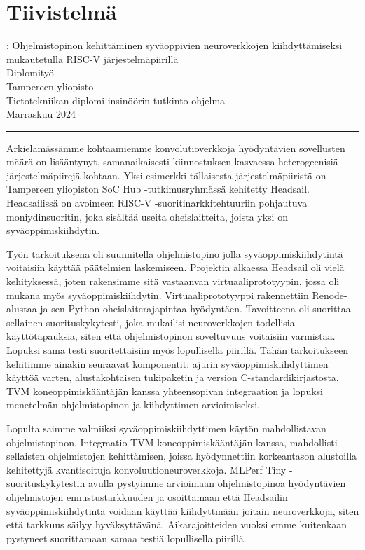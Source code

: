 \documentclass[12pt,a4paper,english
]{tunithesis}
\def\finnishtitle{Ohjelmistopinon kehittäminen syväoppivien neuroverkkojen kiihdyttämiseksi mukautetulla RISC-V järjestelmäpiirillä}
\begin{document}
\clearpage

\chapter*{Tiivistelmä}

\begin{spacing}{1.0}
\noindent \@author: \finnishtitle\\
Diplomityö\\
Tampereen yliopisto\\
Tietotekniikan diplomi-insinöörin tutkinto-ohjelma \\
Marraskuu 2024
\end{spacing}
\noindent\rule{12cm}{0.4pt}

\vspace{0.5cm}


\noindent \foreignlanguage{finnish}{Arkielämässämme kohtaamiemme konvolutioverkkoja hyödyntävien sovellusten mää\-rä on lisääntynyt, samanaikaisesti kiinnostuksen kasvaessa heterogeenisiä jär\-jes\-tel\-mä\-pii\-re\-jä kohtaan. Yksi esimerkki tällaisesta järjestelmäpiiristä on Tampereen yliopiston SoC Hub -tutkimusryhmässä kehitetty Headsail. Headsailissä on avoimeen RISC-V -suoritinarkkitehtuuriin pohjautuva moniydinsuoritin, joka sisältää useita
oheislaitteita, joista yksi on syväoppimiskiihdytin.}

\foreignlanguage{finnish}{Työn tarkoituksena oli suunnitella ohjelmistopino jolla syväoppimiskiihdytintä voitaisiin käyttää päätelmien laskemiseen.
Projektin alkaessa Headsail oli vielä kehityksessä, joten rakensimme sitä vastaanvan virtuaaliprototyypin, jossa oli mukana myös syväoppimiskiihdytin. Virtuaaliprototyyppi rakennettiin Renode-alustaa ja sen Python-oheislaiterajapintaa hyödyntäen. Tavoitteena oli suorittaa sellainen suorituskykytesti, joka mukailisi neuroverkkojen todellisia käyttötapauksia, siten että ohjelmistopinon soveltuvuus voitaisiin varmistaa. Lopuksi sama testi suoritettaisiin myös lopullisella piirillä. Tähän tarkoitukseen kehitimme ainakin seuraavat komponentit: ajurin syväoppimiskiihdyttimen käyttöä varten, alustakohtaisen tukipaketin ja version C-standardikirjastosta, TVM koneoppimiskääntäjän kanssa yhteensopivan integraation ja lopuksi menetelmän ohjelmistopinon  ja kiihdyttimen arvioimiseksi.}

\foreignlanguage{finnish}{Lopulta saimme valmiiksi syväoppimiskiihdyttimen käytön mahdollistavan ohjelmistopinon. Integraatio TVM-koneoppimiskääntäjän kanssa, mahdollisti sellaisten ohjelmistojen kehittämisen, joissa hyödynnettiin korkeantason alustoilla kehitettyjä kvantisoituja konvoluutioneuroverkkoja. MLPerf Tiny -suorituskykytestin avulla pystyimme arvioimaan ohjelmistopinoa hyödyntävien ohjelmistojen ennustustarkkuuden ja osoittamaan että Headsailin syväoppimiskiihdytintä voidaan käyttää kiihdyttmään joitain neuroverkkoja, siten että tarkkuus säilyy hyväksyttävänä. Aikarajoitteiden vuoksi emme kuitenkaan pystyneet suorittamaan samaa testiä lopullisella piirillä.}
\end{document}

